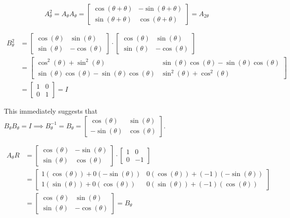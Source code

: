 \documentclass[12pt,letterpaper]{article}
\theoremstyle{definition}
\begin{document}
\[
  A^2_\theta = A_\theta A_\theta = 
  \begin{bmatrix}
    \cos(\theta + \theta) & -\sin(\theta + \theta) \\
    \sin(\theta + \theta) & \cos(\theta + \theta)
  \end{bmatrix} = A_{2\theta}
\]

\begin{align*}
  B^2_\theta &=
  \begin{bmatrix}
    \cos(\theta) & \sin(\theta) \\
    \sin(\theta) & -\cos(\theta)
  \end{bmatrix} \cdot
  \begin{bmatrix}
    \cos(\theta) & \sin(\theta) \\
    \sin(\theta) & -\cos(\theta)
  \end{bmatrix} \\
             &=
  \begin{bmatrix}
    \cos^2(\theta) + \sin^2(\theta) & \sin(\theta)\cos(\theta) - \sin(\theta)\cos(\theta) \\
    \sin(\theta)\cos(\theta) - \sin(\theta)\cos(\theta) & \sin^2(\theta) + \cos^2(\theta)
  \end{bmatrix} \\
             &=
             \begin{bmatrix}
               1 & 0 \\
               0 & 1
             \end{bmatrix} = I
\end{align*}

This immediately suggests that $B_\theta B_\theta = I \implies B^{-1}_\theta =
B_\theta = \begin{bmatrix} \cos(\theta) & \sin(\theta) \\ -\sin(\theta) &
\cos(\theta) \end{bmatrix}$.

\begin{align*}
  A_\theta R &=
  \begin{bmatrix}
    \cos(\theta) & -\sin(\theta) \\
    \sin(\theta) & \cos(\theta)
  \end{bmatrix} \cdot
  \begin{bmatrix}
    1 & 0 \\
    0 & -1
  \end{bmatrix}\\
             &=
             \begin{bmatrix}
               1(\cos(\theta)) + 0(-\sin(\theta)) & 0(\cos(\theta)) +
               (-1)(-\sin(\theta)) \\
               1(\sin(\theta)) + 0(\cos(\theta)) & 0(\sin(\theta)) +
               (-1)(\cos(\theta))
             \end{bmatrix} \\
             &=
             \begin{bmatrix}
               \cos(\theta) & \sin(\theta) \\
               \sin(\theta) & -\cos(\theta)
             \end{bmatrix} = B_\theta
\end{align*}
\end{document}
